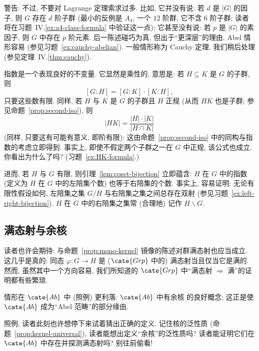 警告: 不过, 不要对 Lagrange 定理索求过多. 比如, 它并没有说: 若 $d$ 是 $|G|$ 的因子, 则 $G$ 存在 $d$ 阶子群 (最小的反例是 $A_4$, 一个 $12$ 阶群, 它不含 $6$ 阶子群; 读者将在习题~IV.\ref{ex:a4-class-formula} 中验证这一点); 它甚至没有说: 若 $p$ 是 $|G|$ 的素因子, 则 $G$ 中存在 $p$ 阶元素. 后一陈述碰巧为真, 但出于``更深层''的理由. Abel 情形容易 (参见习题~\ref{ex:cauchy-abelian}). 一般情形称为 Cauchy 定理, 我们稍后处理 (参见定理~IV.\ref{thm:cauchy}).

指数是一个表现良好的不变量. 它显然是乘性的, 意思是: 若 $H \subseteq K$ 是 $G$ 的子群, 则
\[
[G:H] = [G:K] \cdot [K:H],
\]
只要这些数有限. 同样, 若 $H$ 与 $K$ 是 $G$ 的子群且 $H$ 正规 (从而 $HK$ 也是子群; 参见命题~\ref{prop:second-iso}), 则
\[
|HK| = \frac{|H| \cdot |K|}{|H \cap K|}
\]
(同样, 只要这有可能有意义, 即阶有限): 这由命题~\ref{prop:second-iso} 中的同构与指数的考虑立即得到. 事实上, 即使不假定两个子群之一在 $G$ 中正规, 该公式也成立. 你看出为什么了吗? (习题~\ref{ex:HK-formula}.)

进而, 若 $H$ 与 $G$ 有限, 则引理~\ref{lem:coset-bijection} 立即蕴含: $H$ 在 $G$ 中的指数 (定义为 $H$ 在 $G$ 中的左陪集个数) 也等于右陪集的个数. 事实上, 容易证明: 无论有限性假设如何, 左陪集之集 $G/H$ 与右陪集之集之间总存在双射 (参见习题~\ref{ex:left-right-bijection}). $H$ 在 $G$ 中的右陪集之集常 (合理地) 记作 $H \backslash G$.

\subsection{满态射与余核}
\label{subsec:epi-cokernel}

读者也许会期待: 与命题~\ref{prop:mono-kernel} 镜像的陈述对群满态射也应当成立. 这几乎是真的: 同态 $\varphi : G \to H$ 是 ($\cate{Grp}$ 中的) 满态射当且仅当它是满的. 然而, 虽然其中一个方向容易, 我们所知道的 $\cate{Grp}$ 中``满态射 $\Longrightarrow$ 满''的证明都有些繁琐.

情形在 $\cate{Ab}$ 中 (照例) 更利落: $\cate{Ab}$ 中有余核%
的良好概念; 这正是使 $\cate{Ab}$ 成为``Abel 范畴''的部分缘由.

照例, 读者此刻也许想停下来试着猜出正确的定义. 记住核的泛性质 (命题~\ref{prop:kernel-universal}), 读者能想出定义``余核''的泛性质吗? 读者能证明它们在 $\cate{Ab}$ 中存在并探测满态射吗? 别往前偷看!

